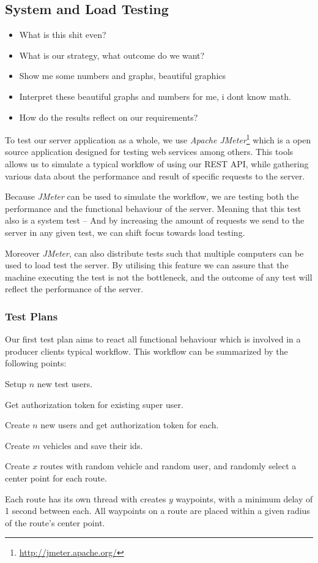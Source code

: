 \subsection{System and Load Testing}
\begin{itemize}
    \item What is this shit even? \checkmark
    \item What is our strategy, what outcome do we want?
    \item Show me some numbers and graphs, beautiful graphics
    \item Interpret these beautiful graphs and numbers for me, i dont know math.
    \item How do the results reflect on our requirements?
\end{itemize}

To test our server application as a whole, we use \textit{Apache JMeter}\footnote{\url{http://jmeter.apache.org/}} which is a open source application designed for testing web services among others.
This tools allows us to simulate a typical workflow of using our REST API, while gathering various data about the performance and result of specific requests to the server.

Because \textit{JMeter} can be used to simulate the workflow, we are testing both the performance and the functional behaviour of the server.
Meaning that this test also is a system test -- And by increasing the amount of requests we send to the server in any given test, we can shift focus towards load testing.

Moreover \textit{JMeter}, can also distribute tests such that multiple computers can be used to load test the server.
By utilising this feature we can assure that the machine executing the test is not the bottleneck, and the outcome of any test will reflect the performance of the server.

\subsubsection{Test Plans}
Our first test plan aims to react all functional behaviour which is involved in a producer clients typical workflow.
This workflow can be summarized by the following points:
\begin{enumberate}
    \item Setup $n$ new test users.
    \begin{enumberate}
        \item Get authorization token for existing super user.
        \item Create $n$ new users and get authorization token for each.
    \end{enumberate}
    \item Create $m$ vehicles and save their ids.
    \item Create $x$ routes with random vehicle and random user, and randomly select a center point for each route.
    \item Each route has its own thread with creates $y$ waypoints, with a minimum delay of 1 second between each. All waypoints on a route are placed within a given radius of the route's center point.
\end{enumberate}

